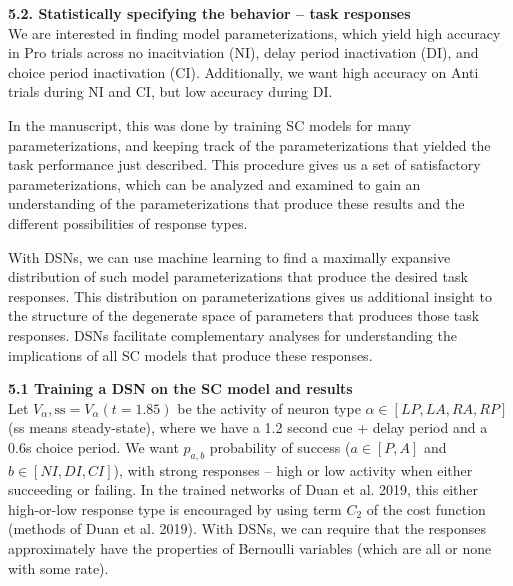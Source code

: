\documentclass[11pt]{article}
\begin{document}
\textbf{5.2. Statistically specifying the behavior -- task responses} \\
We are interested in finding model parameterizations, which yield high accuracy in Pro trials across no inacitviation (NI), delay period inactivation (DI), and choice period inactivation (CI).  Additionally, we want high accuracy on Anti trials during NI and CI, but low accuracy during DI.

In the manuscript, this was done by training SC models for many parameterizations, and keeping track of the parameterizations that yielded the task performance just described.  This procedure gives us a set of satisfactory parameterizations, which can be analyzed and examined to gain an understanding of the parameterizations that produce these results and the different possibilities of response types.  

With DSNs, we can use machine learning to find a maximally expansive distribution of such model parameterizations that produce the desired task responses.  This distribution on parameterizations gives us additional insight to the structure of the degenerate space of parameters that produces those task responses.  DSNs  facilitate complementary analyses for understanding the implications of all SC models that produce these responses.

\textbf{5.1 Training a DSN on the SC model and results} \\
Let $V_\alpha,{\text{ss}} = V_\alpha(t = 1.85)$ be the activity of neuron type $\alpha \in \left[LP, LA, RA, RP \right]$ (ss means steady-state), where we have a 1.2 second cue + delay period and a 0.6s choice period.  We want $p_{a,b}$ probability of success ($a \in \left[P, A \right]$ and $b \in \left[NI, DI, CI \right]$), with strong responses -- high or low activity when either succeeding or failing.  In the trained networks of Duan et al. 2019, this either high-or-low response type is encouraged by using term $C_2$ of the cost function (methods of Duan et al. 2019).  With DSNs, we can require that the responses approximately have the properties of Bernoulli variables (which are all or none with some rate).
\end{document}
